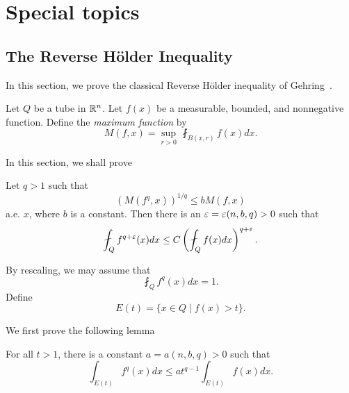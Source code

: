
 \chapter{Special topics}\label{Special_topics}
 \section{The Reverse H\"older Inequality}\label{Reverse_holder}
 In this section, we prove the classical Reverse H\"older inequality of Gehring~\cite{gehring}.
 
 
    Let $Q$ be a tube in $\mathbb R^n$. Let $f(x)$ be a measurable, bounded, and nonnegative function. Define the \emph{maximum function} by
\[
M(f, x)=\sup_{r>0}\,\fint_{B(x,r)} f(x) dx.
\]

In this section, we shall prove
\begin{theorem} Let $q>1$ such that 
\[
(M(f^q,x))^{1/q}\leq b M(f,x)
\]
a.e. $x$, where $b$ is a constant. Then there is an $\varepsilon=\varepsilon(n,b,q)>0$ such that 
\[
\fint_Q f^{q+\eps}(x) dx\leq C \left(\fint_Q f(x) dx\right)^{q+\eps}.
\]
\end{theorem}
 

 By rescaling, we may assume that 
 \begin{equation}\label{0}
 \fint_Q f^q(x) dx=1.
 \end{equation}
 Define
 \[
 E(t)=\{x\in Q\mid f(x)>t\}.
 \]
 

 
 We first prove the following lemma
 
 \begin{lemma}
For all $t>1$, there is a constant $a=a(n,b,q)>0$ such that 
\[
\int_{E(t)} f^q(x) dx\leq at^{q-1}\int_{E(t)} f(x) dx.
\]
\end{lemma}

